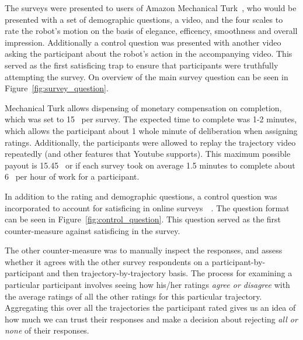 \documentclass[letterpaper, 10 pt, conference]{ieeeconf}  %
\begin{document}
The surveys were presented to users of Amazon Mechanical Turk~\cite{paolacci2010running}, who would be presented with a set of demographic questions, a video, and the four scales to rate the robot's motion on the basis of elegance, efficency, smoothness and overall impression. Additionally a control question was presented with another video asking the participant about the robot's action in the accompanying video. This served as the first satisficing trap to ensure that participants were truthfully attempting the survey. On overview of the main survey question can be seen in Figure~\ref{fig:survey_question}.

Mechanical Turk allows dispensing of monetary compensation on completion, which was set to 15\textcent~ per survey. The expected time to complete was 1-2 minutes, which allows the participant about 1 whole minute of deliberation when assigning ratings. Additionally, the participants were allowed to replay the trajectory video repeatedly (and other features that Youtube supports). This maximum possible payout is 15.45\textdollar~ or if each survey took on average 1.5 minutes to complete about 6\textdollar~ per hour of work for a participant.


In addition to the rating and demographic questions, a control question was incorporated to account for satisficing in online surveys~\cite{krosnick1991response}~\cite{krosnick1996satisficing}. The question format can be seen in Figure~\ref{fig:control_question}. This question served as the first counter-measure against satisficing in the survey. 

The other counter-measure was to manually inspect the responses, and assess whether it agrees with the other survey respondents on a participant-by-participant and then trajectory-by-trajectory basis. The process for examining a particular participant involves seeing how his/her ratings {\em agree or disagree} with the average ratings of all the other ratings for this particular trajectory. Aggregating this over all the trajectories the participant rated gives us an idea of how much we can trust their responses and make a decision about rejecting {\em all or none} of their responses. 
\end{document}
